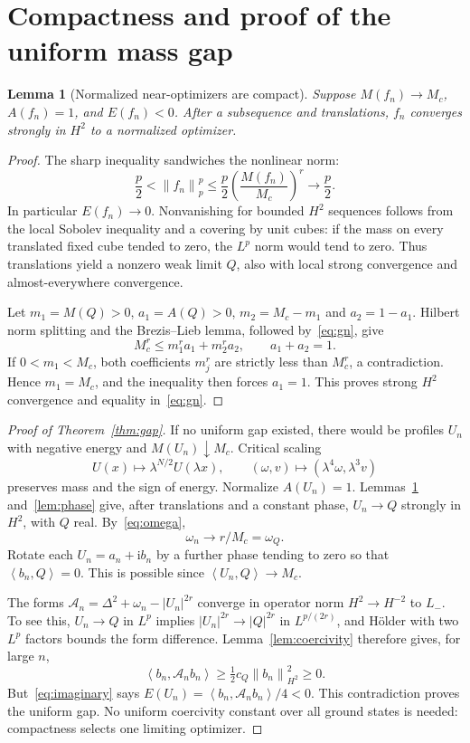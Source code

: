 \documentclass[11pt,a4paper]{article}
\newtheorem{lemma}[theorem]{Lemma}
\theoremstyle{remark}\newtheorem{remark}[theorem]{Remark}
\newcommand{\ii}{\mathrm i}\newcommand{\dd}{\,\mathrm d}
\newcommand{\norm}[1]{\left\|#1\right\|}
\newcommand{\ip}[2]{\left\langle #1,#2\right\rangle}
\begin{document}
\section{Compactness and proof of the uniform mass gap}
\begin{lemma}[Normalized near-optimizers are compact]\label{lem:compact}
Suppose $M(f_n)\to M_c$, $A(f_n)=1$, and $E(f_n)<0$. After a subsequence and translations, $f_n$ converges strongly in $H^2$ to a normalized optimizer.
\end{lemma}
\begin{proof}
The sharp inequality sandwiches the nonlinear norm:
\[
 \frac p2<\norm{f_n}_p^p
 \le\frac p2\left(\frac{M(f_n)}{M_c}\right)^r\longrightarrow\frac p2.
\]
In particular $E(f_n)\to0$. Nonvanishing for bounded $H^2$ sequences follows from the local Sobolev inequality and a covering by unit cubes: if the mass on every translated fixed cube tended to zero, the $L^p$ norm would tend to zero. Thus translations yield a nonzero weak limit $Q$, also with local strong convergence and almost-everywhere convergence.

Let $m_1=M(Q)>0$, $a_1=A(Q)>0$, $m_2=M_c-m_1$ and $a_2=1-a_1$. Hilbert norm splitting and the Brezis--Lieb lemma, followed by~\eqref{eq:gn}, give
\[
 M_c^r\le m_1^r a_1+m_2^r a_2,\qquad a_1+a_2=1.
\]
If $0<m_1<M_c$, both coefficients $m_j^r$ are strictly less than $M_c^r$, a contradiction. Hence $m_1=M_c$, and the inequality then forces $a_1=1$. This proves strong $H^2$ convergence and equality in~\eqref{eq:gn}.
\end{proof}

\begin{proof}[Proof of Theorem~\ref{thm:gap}]
If no uniform gap existed, there would be profiles $U_n$ with negative energy and $M(U_n)\downarrow M_c$. Critical scaling
\[
 U(x)\mapsto\lambda^{N/2}U(\lambda x),\qquad
 (\omega,v)\mapsto(\lambda^4\omega,\lambda^3v)
\]
preserves mass and the sign of energy. Normalize $A(U_n)=1$. Lemmas~\ref{lem:compact} and~\ref{lem:phase} give, after translations and a constant phase, $U_n\to Q$ strongly in $H^2$, with $Q$ real. By~\eqref{eq:omega},
\[
 \omega_n\longrightarrow r/M_c=\omega_Q.
\]
Rotate each $U_n=a_n+\ii b_n$ by a further phase tending to zero so that $\ip{b_n}Q=0$. This is possible since $\ip{U_n}Q\to M_c$.

The forms $\mathcal A_n=\Delta^2+\omega_n-|U_n|^{2r}$ converge in operator norm $H^2\to H^{-2}$ to $L_-$. To see this, $U_n\to Q$ in $L^p$ implies $|U_n|^{2r}\to|Q|^{2r}$ in $L^{p/(2r)}$, and H\"older with two $L^p$ factors bounds the form difference. Lemma~\ref{lem:coercivity} therefore gives, for large $n$,
\[
 \ip{b_n}{\mathcal A_n b_n}\ge\tfrac12c_Q\norm{b_n}_{H^2}^2\ge0.
\]
But~\eqref{eq:imaginary} says $E(U_n)=\ip{b_n}{\mathcal A_n b_n}/4<0$. This contradiction proves the uniform gap. No uniform coercivity constant over all ground states is needed: compactness selects one limiting optimizer.
\end{proof}
\end{document}
